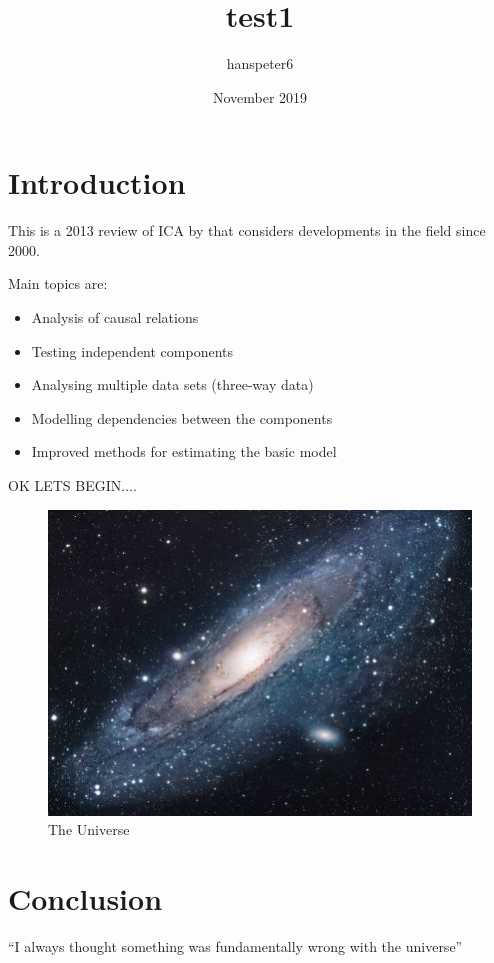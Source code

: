 \documentclass{article}
\title{test1}
\author{hanspeter6 }
\date{November 2019}
\begin{document}
\maketitle

\section{Introduction}
This is a 2013 review of ICA by \cite{hyvarinen2013independent} that considers developments in the field since 2000.

Main topics are:
\begin{itemize}
  \item Analysis of causal relations
  \item Testing independent components
  \item Analysing multiple data sets (three-way data)
  \item Modelling dependencies between the components
  \item Improved methods for estimating the basic model
\end{itemize}

OK LETS BEGIN....

\begin{figure}[h!]
\centering
\includegraphics[scale=1.7]{universe}
\caption{The Universe}
\label{fig:universe}
\end{figure}

\section{Conclusion}
``I always thought something was fundamentally wrong with the universe'' \citep{adams1995hitchhiker}



\end{document}
